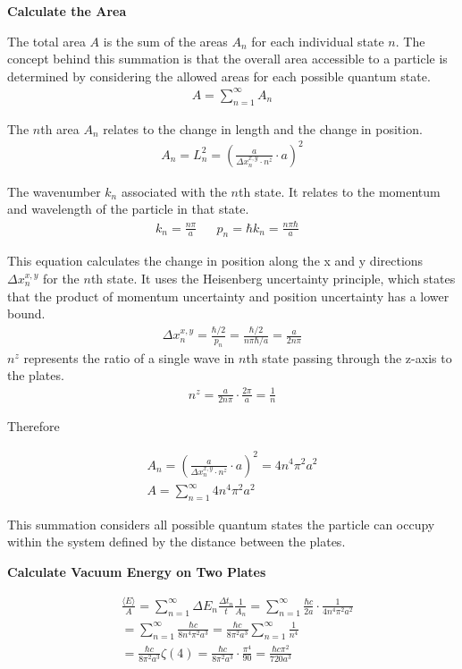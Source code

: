 \noindent\textbf{Calculate the Area}


The total area $A$ is the sum of the areas $A_n$ for each individual state $n$.
The concept behind this summation is that the overall area accessible to 
a particle is determined by considering the allowed areas for each possible quantum state.
\begin{align}
    A = \sum_{n=1}^{\infty}A_n
\end{align}

    The $n$th area $A_n$ relates to the change in length and the change in position.
    \begin{align}
        A_n = L_n^2 = (\frac{a}{\Delta x_n^{x,y} \cdot n^z} \cdot a)^2
    \end{align}

    The wavenumber $k_n$ associated with the $n$th state. It relates to the momentum and wavelength of the particle in that state.
    \begin{align}
        k_n = \frac{n \pi}{a}& &p_n = \hbar k_n = \frac{n \pi \hbar}{a}&
    \end{align}

    This equation calculates the change in position along the x and y directions $\Delta x_n^{x,y}$ for the $n$th state. 
It uses the Heisenberg uncertainty principle, which states that the product of momentum uncertainty and position uncertainty 
has a lower bound.
    \begin{align}
        \Delta x_n^{x, y} = \frac{\hbar/2}{p_n} = \frac{\hbar/2}{n \pi \hbar/a} = \frac{a}{2 n \pi}
    \end{align}
$n^z$ represents the ratio of a single wave in $n$th state passing through the z-axis to the plates.
    \begin{align}
        n^z = \frac{a}{2 n \pi} \cdot \frac{2 \pi}{a} =\frac{1}{n}
    \end{align}
    
Therefore

    \begin{align}
        &A_n = (\frac{a}{\Delta x_n^{x,y} \cdot n^z} \cdot a)^2 = 4 n^4 \pi^2 a^2& \\
        &A = \sum_{n=1}^{\infty}4 n^4 \pi^2 a^2&
    \end{align}

This summation considers all possible quantum states the particle can occupy within the system 
defined by the distance between the plates.

\noindent\textbf{Calculate Vacuum Energy on Two Plates}


\begin{align}
    &\frac{\langle E \rangle}{A} = \sum_{n=1}^{\infty}\Delta E_n\frac{\Delta t_n}{t}\frac{1}{A_n} = \sum_{n=1}^{\infty} \frac{\hbar c }{2 a} \cdot \frac{1}{4 n^4 \pi^2 a^2} \nonumber \\
    &= \sum_{n=1}^{\infty} \frac{\hbar c}{8 n^4 \pi^2 a^3} = \frac{\hbar c}{8 \pi^2 a^3} \sum_{n=1}^{\infty} \frac{1}{n^4} \nonumber \\
    &= \frac{\hbar c}{8 \pi^2 a^3} \zeta(4) = \frac{\hbar c}{8 \pi^2 a^3} \cdot \frac{\pi^4}{90} = \frac{\hbar c \pi^2}{720 a^3}
\end{align}
